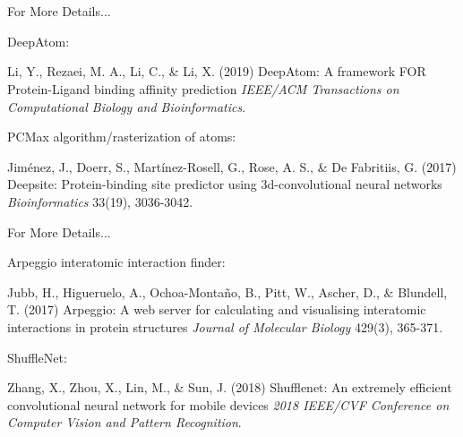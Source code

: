 \documentclass[aspectratio=169,xcolor=dvipsnames]{beamer}
\begin{document}
\section{}
\begin{frame}{For More Details...}
    \footnotesize{
    DeepAtom:
    \begin{thebibliography}{99}
         Li, Y., Rezaei, M. A., Li, C., \& Li, X. (2019)
        \newblock DeepAtom: A framework FOR Protein-Ligand binding affinity prediction
        \newblock \emph{IEEE/ACM Transactions on Computational Biology and Bioinformatics}.
    \end{thebibliography}
    \vspace{3mm}
    PCMax algorithm/rasterization of atoms:
    \begin{thebibliography}{99}
         Jiménez, J., Doerr, S., Martínez-Rosell, G., Rose, A. S., \& De Fabritiis, G. (2017)
        \newblock Deepsite: Protein-binding site predictor using 3d-convolutional neural networks
        \newblock \emph{Bioinformatics} 33(19), 3036-3042.
    \end{thebibliography}
    }
\end{frame}


\begin{frame}{For More Details...}
    \footnotesize{
    Arpeggio interatomic interaction finder:
    \begin{thebibliography}{99}
         Jubb, H., Higueruelo, A., Ochoa-Montaño, B., Pitt, W., Ascher, D., \& Blundell, T. (2017)
        \newblock Arpeggio: A web server for calculating and visualising interatomic interactions in protein structures
        \newblock \emph{Journal of Molecular Biology} 429(3), 365-371.
    \end{thebibliography}
    \vspace{3mm}
    ShuffleNet:
    \begin{thebibliography}{99}
         Zhang, X., Zhou, X., Lin, M., \& Sun, J. (2018)
        \newblock Shufflenet: An extremely efficient convolutional neural network for mobile devices
        \newblock \emph{2018 IEEE/CVF Conference on Computer Vision and Pattern Recognition}.
    \end{thebibliography}
    }
\end{frame}
\end{document}
